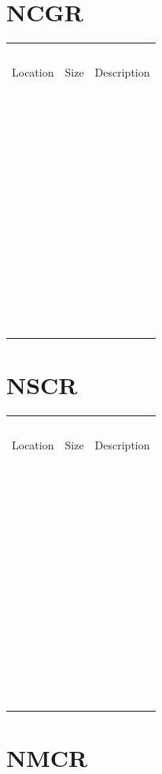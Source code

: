 \documentclass[
]{book}
\begin{document}
\hypertarget{ncgr}{%
\section{NCGR}\label{ncgr}}

\begin{longtable}[]{@{}lll@{}}
\toprule()
\endhead
  &   &   \\
Location & Size & Description \\
  &   &   \\
  &   &   \\
  &   &   \\
  &   &   \\
  &   &   \\
  &   &   \\
  &   &   \\
  &   &   \\
  &   &   \\
  &   &   \\
  &   &   \\
  &   &   \\
  &   &   \\
\bottomrule()
\end{longtable}

\hypertarget{nscr}{%
\section{NSCR}\label{nscr}}

\begin{longtable}[]{@{}lll@{}}
\toprule()
\endhead
  &   &   \\
Location & Size & Description \\
  &   &   \\
  &   &   \\
  &   &   \\
  &   &   \\
  &   &   \\
  &   &   \\
  &   &   \\
  &   &   \\
  &   &   \\
  &   &   \\
  &   &   \\
  &   &   \\
  &   &   \\
\bottomrule()
\end{longtable}

\hypertarget{nmcr}{%
\section{NMCR}\label{nmcr}}
\end{document}
